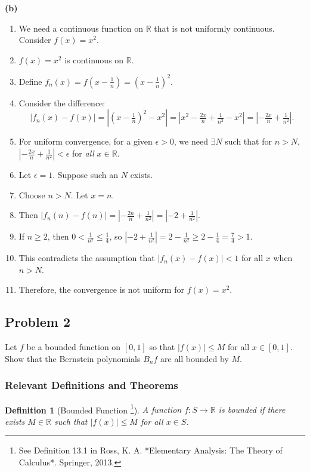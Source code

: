 \documentclass{article}
\newtheorem*{definition}{Definition}
\newcommand{\R}{\mathbb{R}}
\newcommand{\abs}[1]{\left|#1\right|}
\begin{document}
\textbf{(b)}
\begin{enumerate}
    \item We need a continuous function on \(\R\) that is not uniformly continuous. Consider \(f(x) = x^2\).
    \item \(f(x) = x^2\) is continuous on \(\R\).
    \item Define \(f_n(x) = f(x - \tfrac{1}{n}) = (x - \tfrac{1}{n})^2\).
    \item Consider the difference:
    \[ \abs{f_n(x) - f(x)} = \abs{(x - \tfrac{1}{n})^2 - x^2} = \abs{x^2 - \tfrac{2x}{n} + \tfrac{1}{n^2} - x^2} = \abs{-\tfrac{2x}{n} + \tfrac{1}{n^2}}. \]
    \item For uniform convergence, for a given \(\epsilon > 0\), we need \(\exists N\) such that for \(n > N\), \(\abs{-\tfrac{2x}{n} + \tfrac{1}{n^2}} < \epsilon\) for \textit{all} \(x \in \R\).
    \item Let \(\epsilon = 1\). Suppose such an \(N\) exists.
    \item Choose \(n > N\). Let \(x = n\).
    \item Then \(\abs{f_n(n) - f(n)} = \abs{-\tfrac{2n}{n} + \tfrac{1}{n^2}} = \abs{-2 + \tfrac{1}{n^2}}\).
    \item If \(n \ge 2\), then \(0 < \tfrac{1}{n^2} \le \tfrac{1}{4}\), so \(\abs{-2 + \tfrac{1}{n^2}} = 2 - \tfrac{1}{n^2} \ge 2 - \tfrac{1}{4} = \tfrac{7}{4} > 1\).
    \item This contradicts the assumption that \(\abs{f_n(x) - f(x)} < 1\) for all \(x\) when \(n > N\).
    \item Therefore, the convergence is not uniform for \(f(x) = x^2\).
\end{enumerate}

\hrulefill

\subsection*{Problem 2}

Let \(f\) be a bounded function on \([0,1]\) so that \(\abs{f(x)} \le M\) for all \(x\in [0,1]\). Show that the Bernstein polynomials \(B_n f\) are all bounded by \(M\).

\subsubsection*{Relevant Definitions and Theorems}

\begin{definition}[Bounded Function \footnote{See Definition 13.1 in Ross, K. A. *Elementary Analysis: The Theory of Calculus*. Springer, 2013.}]
A function \(f: S \to \R\) is bounded if there exists \(M \in \R\) such that \(\abs{f(x)} \le M\) for all \(x \in S\).
\end{definition}
\end{document}
